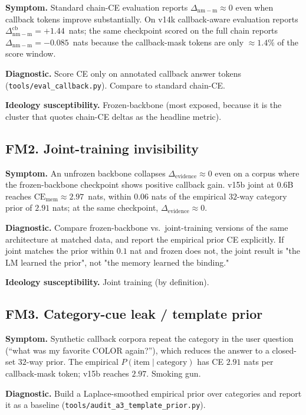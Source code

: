 \documentclass{article}
\newcommand{\dnm}{\Delta_{\mathrm{nm-m}}}
\newcommand{\CEmem}{\mathrm{CE}_{\mathrm{mem}}}
\newcommand{\elift}{\Delta_{\mathrm{evidence}}}
\begin{document}
\textbf{Symptom.}  Standard chain-CE evaluation reports
$\dnm \approx 0$ even when callback tokens improve substantially.
On v14k callback-aware evaluation reports
$\dnm^{\mathrm{cb}}=+1.44$~nats; the same checkpoint scored on
the full chain reports $\dnm = -0.085$~nats because the
callback-mask tokens are only $\approx 1.4\%$ of the score window.

\textbf{Diagnostic.}  Score CE only on annotated callback answer
tokens (\texttt{tools/eval\_callback.py}).  Compare to standard
chain-CE.

\textbf{Ideology susceptibility.}  Frozen-backbone (most exposed,
because it is the cluster that quotes chain-CE deltas as the headline
metric).

\subsection{FM2.  Joint-training invisibility}
\label{sec:fm2}

\textbf{Symptom.}  An unfrozen backbone collapses
$\elift \approx 0$ even on a corpus where the frozen-backbone
checkpoint shows positive callback gain.  v15b joint at 0.6B
reaches $\CEmem \approx 2.97$~nats, within $0.06$ nats of the
empirical $32$-way category prior of $2.91$ nats; at the same
checkpoint, $\elift \approx 0$.

\textbf{Diagnostic.}  Compare frozen-backbone vs.\ joint-training
versions of the same architecture at matched data, and report the
empirical prior CE explicitly.  If joint matches the prior within
$0.1$ nat and frozen does not, the joint result is "the LM learned
the prior", not "the memory learned the binding."

\textbf{Ideology susceptibility.}  Joint training (by definition).

\subsection{FM3.  Category-cue leak / template prior}
\label{sec:fm3}

\textbf{Symptom.}  Synthetic callback corpora repeat the category
in the user question (``what was my favorite COLOR again?''), which
reduces the answer to a closed-set $32$-way prior.  The empirical
$P(\text{item}\mid\text{category})$ has CE $2.91$ nats per
callback-mask token; v15b reaches $2.97$.  Smoking gun.

\textbf{Diagnostic.}  Build a Laplace-smoothed empirical prior over
categories and report it as a baseline
(\texttt{tools/audit\_a3\_template\_prior.py}).
\end{document}
